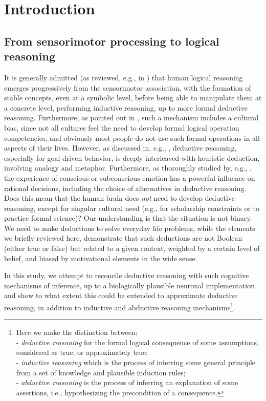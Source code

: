\documentclass[sn-mathphys]{sn-jnl}
\begin{document}

\section{Introduction}

\subsection{From sensorimotor processing to logical reasoning}

It is generally admitted (as reviewed, e.g., in \cite{ness_knowledge_2007}) that human logical reasoning emerges progressively from the sensorimotor association, with the formation of stable concepts, even at a symbolic level, before being able to manipulate them at a concrete level, performing inductive reasoning, up to more formal deductive reasoning. Furthermore, as pointed out in \cite{arnett_adolescence_2001}, such a mechanism includes a cultural bias, since not all cultures feel the need to develop formal logical operation competencies, and obviously most people do not use such formal operations in all aspects of their lives. However, as discussed in, e.g., \cite{keefer_metaphor_2016}, deductive reasoning, especially for goal-driven behavior, is deeply interleaved with heuristic deduction, involving analogy and metaphor. Furthermore, as thoroughly studied by, e.g., \cite{purves_interplay_2001}, the experience of conscious or subconscious emotion has a powerful influence on rational decisions, including the choice of alternatives in deductive reasoning. Does this mean that the human brain does {\em not} need to develop deductive reasoning, except for singular cultural need (e.g., for scholarship constraints or to practice formal science)? Our understanding is that the situation is not binary. We need to make deductions to solve everyday life problems, while the elements we briefly reviewed here, demonstrate that such deductions are not Boolean (either true or false) but related to a given context, weighted by a certain level of belief, and biased by motivational elements in the wide sense.

In this study, we attempt to reconcile deductive reasoning with such cognitive mechanisms of inference, up to a biologically plausible neuronal implementation and show to what extent this could be extended to approximate deductive reasoning, in addition to inductive and abductive reasoning mechanisms\footnote{Here we make the distinction between:
\\- {\em deductive reasoning} for the formal logical consequence of some assumptions, considered as true, or approximately true;
\\- {\em inductive reasoning} which is the process of inferring some general principle from a set of knowledge and plausible induction rules;
\\- {\em abductive reasoning} is the process of inferring an explanation of some assertions, i.e., hypothesizing the precondition of a consequence.}.
\end{document}
